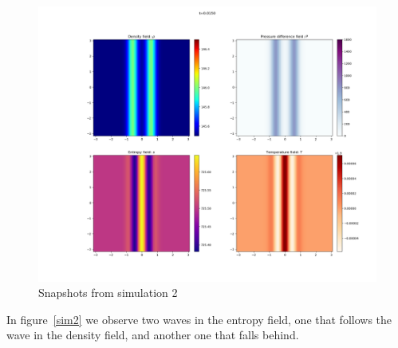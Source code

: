 \documentclass{article}
\begin{document}
\begin{figure}[h]
    \includegraphics[width=\textwidth/3]{Sim 2/SF02_0006.png}
    \caption{Snapshots from simulation 2}
    \label{sim2_start}
\end{figure}

In figure~\ref{sim2} we observe two waves in the entropy field, one that follows the wave in the density field, and another one that falls behind.
\end{document}

